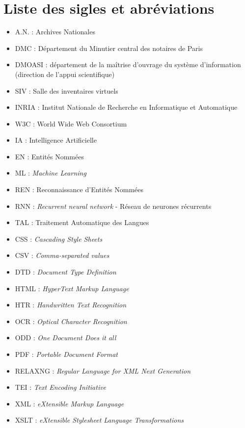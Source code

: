 \chapter*{Liste des sigles et abréviations}

\begin{itemize}
    \item A.N. : Archives Nationales
    \item DMC : Département du Minutier central des notaires de Paris  
    \item DMOASI : département de la maîtrise d’ouvrage du système d’information (direction de l’appui scientifique) 
    \item SIV : Salle des inventaires virtuels 
    \item INRIA : Institut Nationale de Recherche en Informatique et Automatique
    \item W3C : World Wide Web Consortium
    \item IA : Intelligence Artificielle 
    \item EN : Entités Nommées
    \item ML : \emph{Machine Learning}
    \item REN : Reconnaissance d'Entités Nommées
    \item RNN : \emph{Recurrent neural network} - Réseau de neurones récurrents
    \item TAL : Traitement Automatique des Langues
    \item CSS : \emph{Cascading Style Sheets}
    \item CSV : \emph{Comma-separated values}
    \item DTD : \emph{Document Type Definition}
    \item HTML : \emph{HyperText Markup Language}
    \item HTR : \emph{Handwritten Text Recognition}
    \item OCR : \emph{Optical Character Recognition}
    \item ODD : \emph{One Document Does it all}
    \item PDF : \emph{Portable Document Format}
    \item RELAXNG : \emph{Regular Language for XML Next Generation}
    \item TEI : \emph{Text Encoding Initiative}
    \item XML : \emph{eXtensible Markup Language}
    \item XSLT : \emph{eXtensible Stylesheet Language Transformations}
\end{itemize}